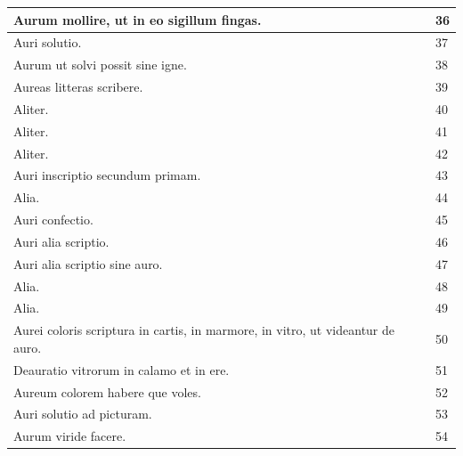 \documentclass[a4paper, 11pt, oneside, polutonikogreek, italian]{article}
\begin{document}
\begin{center}
\begin{longtable}{|p{60mm}|l|}
         Aurum mollire, ut in eo sigillum fingas.                                        & 36 \\ \hline
         Auri solutio.                                                                   & 37 \\ \hline
         Aurum ut solvi possit sine igne.                                                & 38 \\ \hline
         Aureas litteras scribere.                                                       & 39 \\ \hline
         Aliter.                                                                         & 40 \\ \hline
         Aliter.                                                                         & 41 \\ \hline
         Aliter.                                                                         & 42 \\ \hline
         Auri inscriptio secundum primam.                                                & 43 \\ \hline
         Alia.                                                                           & 44 \\ \hline
         Auri confectio.                                                                 & 45 \\ \hline
         Auri alia scriptio.                                                             & 46 \\ \hline
         Auri alia scriptio sine auro.                                                   & 47 \\ \hline
         Alia.                                                                           & 48 \\ \hline
         Alia.                                                                           & 49 \\ \hline
         Aurei coloris scriptura in cartis, in marmore, in vitro, ut videantur de auro.  & 50 \\ \hline
         Deauratio vitrorum in calamo et in ere.                                         & 51 \\ \hline
         Aureum colorem habere que voles.                                                & 52 \\ \hline
         Auri solutio ad picturam.                                                       & 53 \\ \hline
         Aurum viride facere.                                                            & 54 \\ \hline

\end{longtable}
\end{center}
\end{document}
